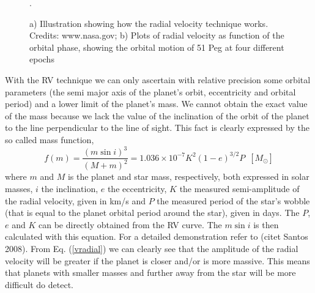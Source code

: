 \documentclass[dvips,12pt,a4paper]{report}
\begin{document}
\begin{figure}[h]
\centering
{}
\caption[The RV Technique illustration and plots]{a) Illustration showing how the radial velocity technique works. Credits: www.nasa.gov; b) Plots of radial velocity as function of the orbital phase, showing the orbital motion of 51 Peg at four different epochs \citep{Mayor-1995}}.
\label{rvpic}
\end{figure}

With the RV technique we can only ascertain with relative precision some orbital parameters (the semi major axis of the planet's orbit, eccentricity and orbital period) and a lower limit of the planet's mass. We cannot obtain the exact value of the mass because we lack the value of the inclination of the orbit of the planet to the line perpendicular to the line of sight. This fact is clearly expressed by the so called mass function,
\begin{equation}
 f(m)=\frac{(m \sin i)^3}{(M+m)^2}=1.036\times10^{-7}K^2(1-e)^{3/2}P\,\,\, [M_\odot]
\label {vradial}
\end{equation}
where $m$ and $M$ is the planet and star mass, respectively, both expressed in solar masses, $i$ the inclination, $e$ the eccentricity, $K$ the measured semi-amplitude of the radial velocity, given in km/s and $P$ the measured period of the star's wobble (that is equal to the planet orbital period around the star), given in days. The $P$, $e$ and $K$ can be directly obtained from the RV curve. The $m \sin i$ is then calculated with this equation. For a detailed demonstration refer to (citet Santos 2008). From Eq. (\ref{vradial}) we can clearly see that the amplitude of the radial velocity will be greater if the planet is closer and/or is more massive. This means that planets with smaller masses and further away from the star will be more difficult do detect. 
\end{document}
